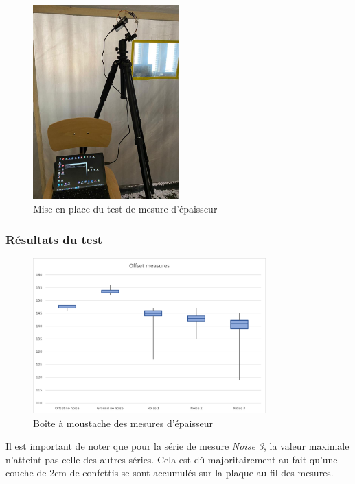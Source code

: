 \begin{figure}[H]
    \centering
    \includegraphics[width=0.5\textwidth]{Images/LiDAR/OffsetMes_InLab.jpeg}
    \caption{Mise en place du test de mesure d'épaisseur}
    \label{OffsetMes_Labo}
\end{figure}

\subsubsection{Résultats du test}

\begin{figure}[H]
    \centering
    \includegraphics[width=0.8\textwidth]{Images/LiDAR/LiDAR_OffsetMes_Moustache.png}
    \caption{Boîte à moustache des mesures d'épaisseur}
    \label{OffsetMes_Moustache}
\end{figure}

Il est important de noter que pour la série de mesure \emph{Noise 3}, la valeur maximale n'atteint
pas celle des autres séries. Cela est dû majoritairement au fait qu'une couche de 2cm de confettis
se sont accumulés sur la plaque au fil des mesures.

